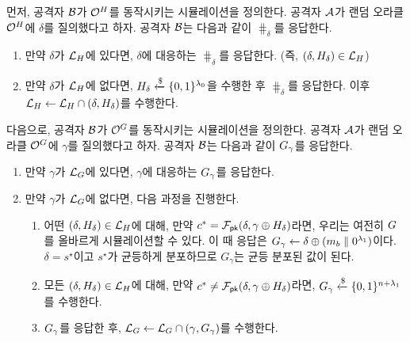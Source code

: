 \documentclass{article}
\theoremstyle{definition}
\newtheorem{memo}{메모}
\begin{document}

먼저, 공격자 $\mathcal{B}$가 $\mathcal{O}^{H}$를 동작시키는 시뮬레이션을 정의한다. 공격자
$\mathcal{A}$가 랜덤 오라클 $\mathcal{O}^{H}$에 $\delta$를 질의했다고 하자. 공격자
$\mathcal{B}$는 다음과 같이 $\hash_{\delta}$를 응답한다.
\begin{enumerate}
	\item 만약 $\delta$가 $\mathcal{L}_{H}$에 있다면, $\delta$에 대응하는
	$\hash_\delta$를 응답한다. (즉, $(\delta, H_{\delta}) \in \mathcal{L}_{H}$)
	\item 만약 $\delta$가 $\mathcal{L}_{H}$에 없다면, $H_{\delta} \xleftarrow{\$}
	\{0 ,1\}^{\lambda_0}$을 수행한 후 $\hash_{\delta}$를 응답한다. 이후
	$\mathcal{L}_{H} \gets \mathcal{L}_{H} \cap (\delta, H_{\delta})$를
	수행한다.
\end{enumerate}

다음으로, 공격자 $\mathcal{B}$가 $\mathcal{O}^{G}$를 동작시키는 시뮬레이션을 정의한다.
공격자 $\mathcal{A}$가 랜덤 오라클 $\mathcal{O}^{G}$에 $\gamma$를 질의했다고 하자. 공격자
$\mathcal{B}$는 다음과 같이 $G_{\gamma}$를 응답한다.
\begin{enumerate}
	\item 만약 $\gamma$가 $\mathcal{L}_{G}$에 있다면, $\gamma$에 대응하는
	$G_{\gamma}$를 응답한다.
	\item 만약 $\gamma$가 $\mathcal{L}_{G}$에 없다면, 다음 과정을 진행한다.
	\begin{enumerate}
		\item 어떤 $(\delta, H_{\delta}) \in \mathcal{L}_{H}$에 대해, 만약
		$c^* = \mathcal{F}_{\textsf{pk}}(\delta, \gamma \oplus H_{\delta})$라면, 우리는 여전히
		$G$를 올바르게 시뮬레이션할 수 있다. 이 때 응답은 $G_{\gamma}
		\gets \delta \oplus (m_{b} \parallel 0^{\lambda_1})$이다. $\delta =
		s^\star$이고 $s^\star$가 균등하게 분포하므로 $G_\gamma$는 균등 분포된
		값이 된다. 
		\item 모든 $(\delta, H_{\delta}) \in \mathcal{L}_{H}$에 대해, 만약
		$c^* \neq \mathcal{F}_{\textsf{pk}}(\delta, \gamma \oplus H_{\delta})$라면,
		$G_{\gamma} \xleftarrow{\$} \{0 ,1\}^{n + \lambda_1}$를 수행한다.
		\item $G_{\gamma}$를 응답한 후, $\mathcal{L}_{G} \gets \mathcal{L}_{G}
		\cap (\gamma, G_{\gamma})$를 수행한다.
	\end{enumerate}
\end{enumerate}
\end{document}
